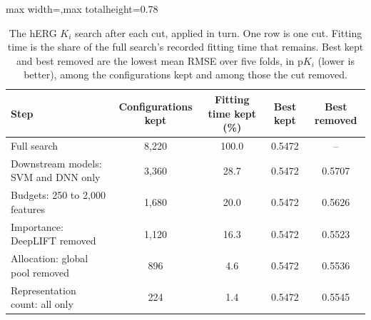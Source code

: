 \begin{table}[htbp]
\centering
\small
\begin{adjustbox}{max width=\textwidth,max totalheight=0.78\textheight}
\begin{tabular}{@{}lcccc@{}}
\toprule
Step & Configurations kept & Fitting time kept (\%) & Best kept & Best removed \\
\midrule
Full search & 8{,}220 & 100.0 & 0.5472 & -- \\
Downstream models: SVM and DNN only & 3{,}360 & 28.7 & 0.5472 & 0.5707 \\
Budgets: 250 to 2{,}000 features & 1{,}680 & 20.0 & 0.5472 & 0.5626 \\
Importance: DeepLIFT removed & 1{,}120 & 16.3 & 0.5472 & 0.5523 \\
Allocation: global pool removed & 896 & 4.6 & 0.5472 & 0.5536 \\
Representation count: all only & 224 & 1.4 & 0.5472 & 0.5545 \\
\bottomrule
\end{tabular}
\end{adjustbox}
\caption[What each cut removes from the hERG $K_i$ search.]{The hERG $K_i$ search after each cut, applied in turn. One row is one cut. Fitting time is the share of the full search's recorded fitting time that remains. Best kept and best removed are the lowest mean RMSE over five folds, in p$K_i$ (lower is better), among the configurations kept and among those the cut removed.}
\label{tab:cut_walkthrough}
\end{table}

